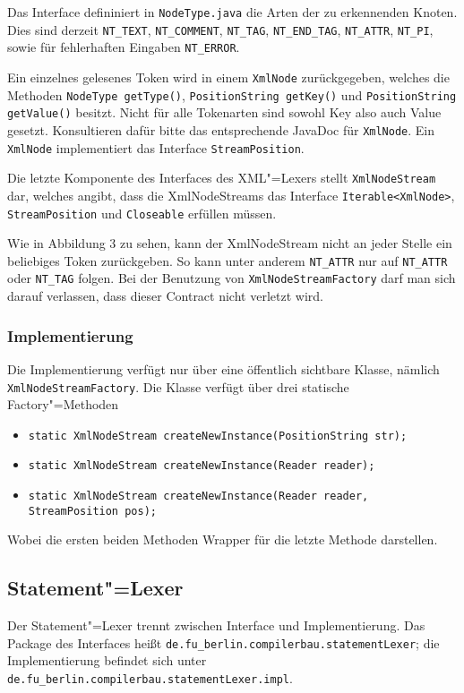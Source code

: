 \documentclass[10pt,a4paper,ngerman,titlepage,tocindentauto]{scrartcl}
\newcommand{\n}{\linebreak[1]}
\begin{document}
				Das Interface defininiert in \texttt{NodeType.java} die Arten der zu erkennenden Knoten.
				Dies sind derzeit \texttt{NT\_TEXT}, \texttt{NT\_COMMENT}, \texttt{NT\_TAG}, \texttt{NT\_END\_TAG},
				\texttt{NT\_ATTR}, \texttt{NT\_PI}, sowie für fehlerhaften Eingaben \texttt{NT\_ERROR}.
				
				Ein einzelnes gelesenes Token wird in einem \texttt{XmlNode} zurückgegeben, welches die Methoden
				\texttt{NodeType getType()}, \texttt{PositionString getKey()} und \texttt{PositionString getValue()}
				besitzt. Nicht für alle Tokenarten sind sowohl Key also auch Value gesetzt. Konsultieren dafür
				bitte das entsprechende JavaDoc für \texttt{XmlNode}. Ein \texttt{XmlNode} implementiert das Interface
				\texttt{StreamPosition}.
				
				Die letzte Komponente des Interfaces des XML"=Lexers stellt \texttt{XmlNodeStream} dar, welches
				angibt, dass die XmlNodeStreams das Interface \texttt{Iterable<{\n}XmlNode>}, \texttt{StreamPosition} und
				\texttt{Closeable} erfüllen müssen.
				
				Wie in Abbildung 3 zu sehen, kann der XmlNodeStream nicht an jeder Stelle ein beliebiges Token zurückgeben.
				So kann unter anderem \texttt{NT\_ATTR} nur auf \texttt{NT\_ATTR} oder \texttt{NT\_TAG} folgen.
				Bei der Benutzung von \texttt{XmlNodeStreamFactory} darf man sich darauf verlassen, dass dieser Contract
				nicht verletzt wird.
			
			\subsubsection*{Implementierung}
				Die Implementierung verfügt nur über eine öffentlich sichtbare Klasse, nämlich \texttt{Xml\-Node\-Stream\-Factory}.
				Die Klasse verfügt über drei statische Factory"=Methoden
				\begin{itemize}
					\item \texttt{static XmlNodeStream createNewInstance(PositionString str);}
					\item \texttt{static XmlNodeStream createNewInstance(Reader reader);}
					\item \texttt{static XmlNodeStream createNewInstance(Reader reader, StreamPosition pos);}
				\end{itemize}
				Wobei die ersten beiden Methoden Wrapper für die letzte Methode darstellen.
	
		\subsection{Statement"=Lexer}
			Der Statement"=Lexer trennt zwischen Interface und Implementierung.
			Das Package des Interfaces heißt \texttt{de.{\n}fu\_berlin.{\n}compilerbau.{\n}statementLexer};
			die Implementierung befindet sich unter \texttt{de.{\n}fu\_berlin.{\n}compilerbau.{\n}statement\-Lexer.{\n}impl}.
			
\end{document}
